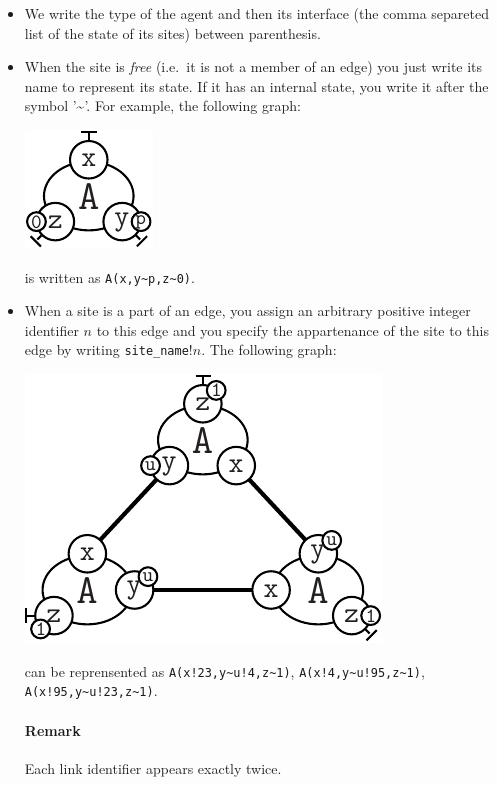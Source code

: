 \documentclass[11pt]{book}
\def\intstate{\textasciitilde}
\def\ttt#1{\texttt{#1}}
\def\ie{i.e.~}
\newcommand{\Remark}{\paragraph{Remark}}
\begin{document}
\begin{itemize}
\item We write the type of the agent and then its interface (the comma
  separeted list of the state of its sites) between parenthesis.
\item When the site is \emph{free} ({\ie}it is not a member of an edge) you
  just write its name to represent its state. If it has an internal
  state, you write it after the symbol  '\intstate'. For example, the following graph:
  \begin{center}
    \includegraphics[bb=0 0 61 57]{gkappa_img/syntax_agent.pdf}
  \end{center}
  is written as \ttt{A(x,y\intstate{}p,z\intstate{}0)}.
\item When a site is a part of an edge, you assign an arbitrary positive
  integer identifier $n$ to this edge and you specify the appartenance
  of the site to this edge by writing \ttt{site\_name$!n$}. The following graph:
  \begin{center}
    \includegraphics[bb=0 0 171 129]{gkappa_img/syntax_ring.pdf}
  \end{center}
  can be reprensented as \ttt{A(x!23,y\intstate{}u!4,z\intstate{}1)},
  \ttt{A(x!4,y\intstate{}u!95,z\intstate{}1)},
  \ttt{A(x!95,y\intstate{}u!23,z\intstate{}1)}.

  \Remark{Each link identifier appears exactly twice. %
  }
\end{itemize}
\end{document}
